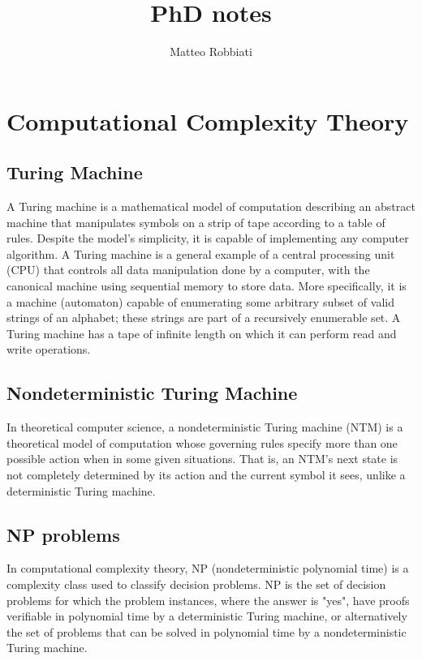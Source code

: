 \documentclass[11pt]{article}
\title{PhD notes}
\author{Matteo Robbiati}
\date{}
\begin{document}
\maketitle

\tableofcontents


\section{Computational Complexity Theory}

\subsection{Turing Machine}

A Turing machine is a mathematical model of computation describing an abstract 
machine that manipulates symbols on a strip of tape according to a table of rules. 
Despite the model's simplicity, it is capable of implementing any computer 
algorithm. A Turing machine is a general example of a central processing unit 
(CPU) that controls all data manipulation done by a computer, with the canonical 
machine using sequential memory to store data. More specifically, it is a machine 
(automaton) capable of enumerating some arbitrary subset of valid strings of an 
alphabet; these strings are part of a recursively enumerable set. A Turing 
machine has a tape of infinite length on which it can perform read and write 
operations.

\subsection{Nondeterministic Turing Machine}

In theoretical computer science, a nondeterministic Turing machine (NTM) is a 
theoretical model of computation whose governing rules specify more than one 
possible action when in some given situations. That is, an NTM's next state is 
not completely determined by its action and the current symbol it sees, unlike 
a deterministic Turing machine.

\subsection{NP problems}

In computational complexity theory, NP (nondeterministic polynomial time) is a 
complexity class used to classify decision problems. NP is the set of decision 
problems for which the problem instances, where the answer is "yes", have proofs 
verifiable in polynomial time by a deterministic Turing machine, or alternatively 
the set of problems that can be solved in polynomial time by a nondeterministic 
Turing machine.
\end{document}
